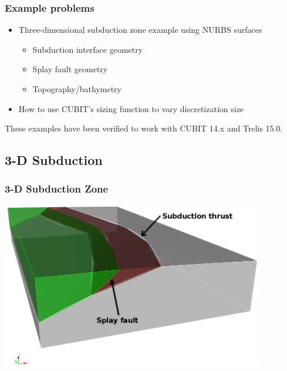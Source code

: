 \documentclass{beamer}
\newcommand{\important}[1]{{\color{red}#1}}
\begin{document}
\begin{frame}
  \frametitle{Example problems}
  
  \begin{itemize}
  \item Three-dimensional subduction zone example using NURBS surfaces\\
    \important{{\tt examples/meshing/surface\_nurbs/subduction}}
    \begin{itemize}
    \item Subduction interface geometry
    \item Splay fault geometry
    \item Topography/bathymetry
    \end{itemize}
  \item How to use CUBIT's sizing function to vary discretization size\\
    \important{{\tt examples/meshing/cubit\_cellsize}}
  \end{itemize}
  \vfill
  \important{These examples have been verified to work with CUBIT 14.x and Trelis 15.0.}


\end{frame}


\subsection{3-D Subduction}

\begin{frame}
  \frametitle{3-D Subduction Zone}
 
  \vfill
  \begin{center}
    \includegraphics[width=4.5in]{figs/subduction3d_geometry}
  \end{center}
  \vfill

\end{frame}
\end{document}
